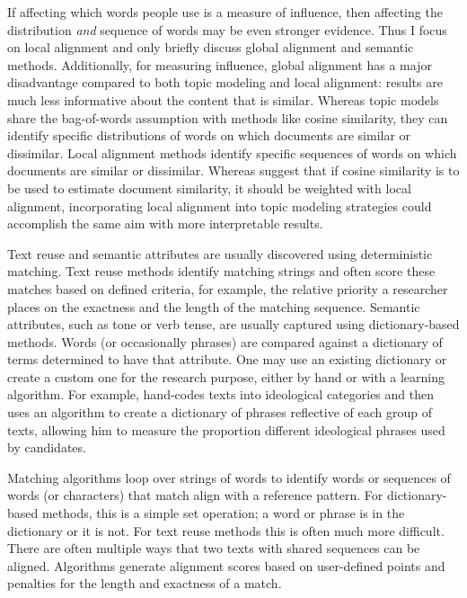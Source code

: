 \documentclass{article}
\begin{document}
If affecting which words people use is a measure of influence, then affecting the distribution \textit{and} sequence of words may be even stronger evidence. Thus I focus on local alignment and only briefly discuss global alignment and semantic methods. %
Additionally, for measuring influence, global alignment has a major disadvantage compared to both topic modeling and local alignment: results are much less informative about the content that is similar. Whereas topic models share the bag-of-words assumption with methods like cosine similarity, they can identify specific distributions of words on which documents are similar or dissimilar. Local alignment methods identify specific sequences of words on which documents are similar or dissimilar. Whereas \citet{Acree2016} suggest that if cosine similarity is to be used to estimate document similarity, it should be weighted with local alignment, incorporating local alignment into topic modeling strategies could accomplish the same aim with more interpretable results. 

Text reuse and semantic attributes are usually discovered using deterministic matching. Text reuse methods identify matching strings and often score these matches based on defined criteria, for example, the relative priority a researcher places on the exactness and the length of the matching sequence. Semantic attributes, such as tone or verb tense, are usually captured using dictionary-based methods. Words (or occasionally phrases) are compared against a dictionary of terms determined to have that attribute. One may use an existing dictionary or create a custom one for the research purpose, either by hand or with a learning algorithm. For example, \citet{Acree2014} hand-codes texts into ideological categories and then uses an algorithm to create a dictionary of phrases reflective of each group of texts, allowing him to measure the proportion different ideological phrases used by candidates. 

Matching algorithms loop over strings of words to identify words or sequences of words (or characters) that match align with a reference pattern. For dictionary-based methods, this is a simple set operation; a word or phrase is in the dictionary or it is not. For text reuse methods this is often much more difficult. There are often multiple ways that two texts with shared sequences can be aligned. Algorithms generate alignment scores based on user-defined points and penalties for the length and exactness of a match. 
\end{document}
